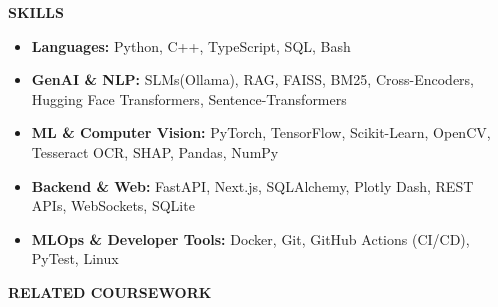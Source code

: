 \documentclass[10pt]{article}
\newcommand{\resheading}[1]{{\small \colorbox{mygrey}{\begin{minipage}{\dimexpr\textwidth-2\fboxsep\relax}\textbf{#1 \vphantom{p\^{E}}}\end{minipage}}}}
\begin{document}
\noindent
\resheading{SKILLS}
\begin{itemize}[noitemsep, leftmargin=*]\small
\item \textbf{Languages:} Python, C++, TypeScript, SQL, Bash
\item \textbf{GenAI \& NLP:} SLMs(Ollama), RAG, FAISS, BM25, Cross-Encoders, Hugging Face Transformers, Sentence-Transformers
\item \textbf{ML \& Computer Vision:} PyTorch, TensorFlow, Scikit-Learn, OpenCV, Tesseract OCR, SHAP, Pandas, NumPy
\item \textbf{Backend \& Web:} FastAPI, Next.js, SQLAlchemy, Plotly Dash, REST APIs, WebSockets, SQLite
\item \textbf{MLOps \& Developer Tools:} Docker, Git, GitHub Actions (CI/CD), PyTest, Linux
\end{itemize}

\vspace{3pt}
\noindent
\resheading{RELATED COURSEWORK}\par
\vspace{2pt}
\end{document}
